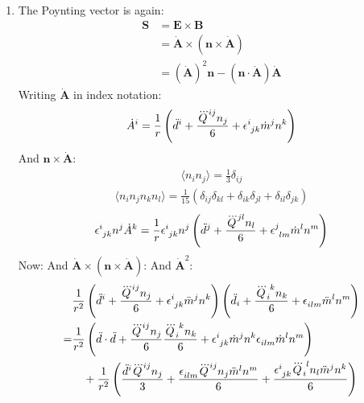 \documentclass[12pt,a4]{article}
\begin{document}
\begin{enumerate}
\begin{enumerate}
      \item
        The Poynting vector is again:
        \begin{align*}
          \mathbf{S} &= \mathbf{E} \times \mathbf{B}\\
                     &= \dot{\mathbf{A}} \times \left(\mathbf{n} \times \dot{\mathbf{A}}\right)\\
                     &= \left(\dot{\mathbf{A}}\right)^2\mathbf{n} - \left(\mathbf{n} \cdot \dot{\mathbf{A}}\right) \dot{\mathbf{A}}
        \end{align*}
        Writing $\dot{\mathbf{A}}$ in index notation:
        \begin{equation*}
          \dot{A}^i = \frac{1}{r} \left(\ddot{d}^i + \frac{\dddot{Q}^{ij}n_j}{6} + \tensor{\epsilon}{^i_j_k}\dot m^j n^k\right)
        \end{equation*}
        And $\mathbf{n} \times \dot{\mathbf{A}} $:
        \begin{align*}
          \langle n_i n_j\rangle = \frac{1}{3}\delta_{ij}
        \end{align*}
        \begin{align*}
          \langle n_i n_jn_kn_l\rangle = \frac{1}{15}(\delta_{ij}\delta_{kl} + \delta_{ik}\delta_{jl} + \delta_{il}\delta_{jk})
        \end{align*}
        \begin{equation*}
          \tensor{\epsilon}{^i_j_k}n^j \dot {A}^k = \frac{1}{r} \tensor{\epsilon}{^i_j_k}n^j  \left(\ddot{d}^j + \frac{\dddot{Q}^{jl}n_l}{6} + \tensor{\epsilon}{^j_l_m}\dot m^l n^m\right)
        \end{equation*}
        Now:
        And $\dot{\mathbf{A}} \times (\mathbf{n} \times \dot{\mathbf{A}})$:
        And $\dot{\mathbf{A}}^2$:
        \begin{align*}
          &\frac{1}{r^2}\left(\ddot{d}^i + \frac{\dddot{Q}^{ij}n_j}{6} + \tensor{\epsilon}{^i_j_k}\ddot m^j n^k\right) \left(\ddot{d}_i + \frac{\tensor{\dddot{Q}}{_i^k}n_k}{6} + \tensor{\epsilon}{_i_l_m}\ddot m^l n^m\right)\\
          = &\frac{1}{r^2}\left(\ddot{d} \cdot \ddot{d} + \frac{\dddot{Q}^{ij}n_j}{6} \frac{\tensor{\dddot{Q}}{_i^k}n_k}{6} + \tensor{\epsilon}{^i_j_k}\dot m^j n^k \tensor{\epsilon}{_i_l_m}\dot m^l n^m\right) \\
            &\quad + \frac{1}{r^2}\left(\frac{\ddot{d}^i \dddot{Q}^{ij}n_j}{3} + \frac{ \tensor{\epsilon}{_i_l_m}\dddot{Q}^{ij}n_j \ddot m^l n^m}{6} + \frac{ \tensor{\epsilon}{^i_j_k}\tensor{\dddot{Q}}{_i^l}n_l \ddot m^j n^k}{6} \right)\\

\end{align*}
\end{enumerate}
\end{enumerate}
\end{document}
